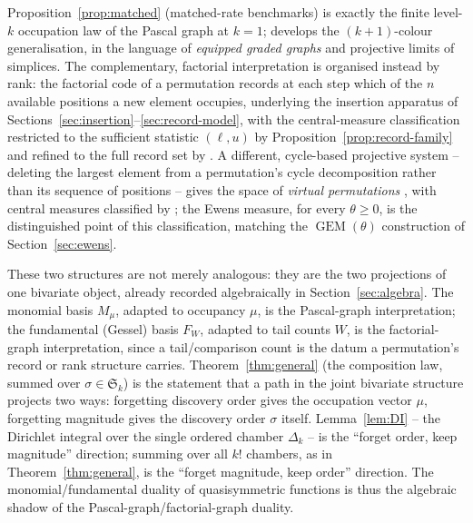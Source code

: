 \documentclass[11pt]{article}
\DeclareMathOperator{\GEM}{GEM}
\theoremstyle{plain}
\theoremstyle{definition}
\begin{document}
Proposition~\ref{prop:matched} (matched-rate benchmarks) is exactly the finite level-\(k\) occupation law of the Pascal graph at \(k=1\); \cite{VershikEquippedGraphs2015} develops the \((k+1)\)-colour generalisation, in the language of \emph{equipped graded graphs} and projective limits of simplices. The complementary, factorial interpretation is organised instead by rank: the factorial code of a permutation \cite{Laisant1888} records at each step which of the \(n\) available positions a new element occupies, underlying the insertion apparatus of Sections~\ref{sec:insertion}--\ref{sec:record-model}, with the central-measure classification restricted to the sufficient statistic \((\ell,u)\) by Proposition~\ref{prop:record-family} and refined to the full record set by \cite{GnedinBiasRecord}. A different, cycle-based projective system -- deleting the largest element from a permutation's cycle decomposition rather than its sequence of positions -- gives the space of \emph{virtual permutations} \cite{KerovOlshanskiVershik1993}, with central measures classified by \cite{Tsilevich1999}; the Ewens measure, for every \(\theta\ge0\), is the distinguished point of this classification, matching the \(\GEM(\theta)\) construction of Section~\ref{sec:ewens}.

These two structures are not merely analogous: they are the two projections of one bivariate object, already recorded algebraically in Section~\ref{sec:algebra}. The monomial basis \(M_\mu\), adapted to occupancy \(\mu\), is the Pascal-graph interpretation; the fundamental (Gessel) basis \(F_W\), adapted to tail counts \(W\), is the factorial-graph interpretation, since a tail/comparison count is the datum a permutation's record or rank structure carries. Theorem~\ref{thm:general} (the composition law, summed over \(\sigma\in\mathfrak S_k\)) is the statement that a path in the joint bivariate structure projects two ways: forgetting discovery order gives the occupation vector \(\mu\), forgetting magnitude gives the discovery order \(\sigma\) itself. Lemma~\ref{lem:DI} -- the Dirichlet integral over the single ordered chamber \(\Delta_k\) -- is the ``forget order, keep magnitude'' direction; summing over all \(k!\) chambers, as in Theorem~\ref{thm:general}, is the ``forget magnitude, keep order'' direction. The monomial/fundamental duality of quasisymmetric functions is thus the algebraic shadow of the Pascal-graph/factorial-graph duality.
\end{document}
